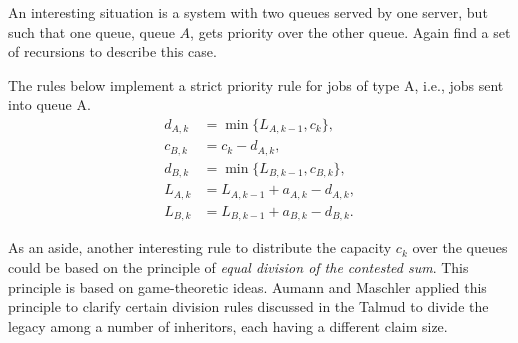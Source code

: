 \begin{exercise}
 An interesting situation is a system with two queues served by one server, but such that one queue, queue $A$, gets priority over the other queue.
 Again find a set of recursions to describe this case.
\begin{solution}
 The rules below implement a strict priority rule for jobs of type
 A, i.e., jobs sent into queue A.
\begin{equation*}
 \begin{split}
 d_{A,k} &= \min\{L_{A,k-1}, c_k\}, \\
 c_{B,k} &= c_k - d_{A,k}, \\
 d_{B,k} &= \min\{L_{B,k-1}, c_{B,k}\}, \\
 L_{A,k} &= L_{A,k-1} + a_{A,k} - d_{A,k}, \\
 L_{B,k} &= L_{B,k-1} + a_{B,k} - d_{B,k}.
 \end{split}
\end{equation*}

As an aside, another interesting rule to distribute the capacity $c_k$ over the queues could be based on the principle of \textit{ equal division of the contested sum}.
This principle is based on game-theoretic ideas.
Aumann and Maschler applied this principle to clarify certain division rules discussed in the Talmud to divide the legacy among a number of inheritors, each having a different claim size.
\end{solution}
\end{exercise}



